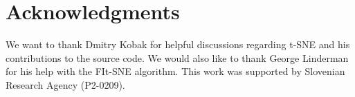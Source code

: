 \documentclass[article]{jss}
\begin{document}
\section*{Acknowledgments}

We want to thank Dmitry Kobak for helpful discussions regarding t-SNE and his
contributions to the source code. We would also like to thank George Linderman
for his help with the FIt-SNE algorithm. This work was supported by Slovenian
Research Agency (P2-0209).




\end{document}
